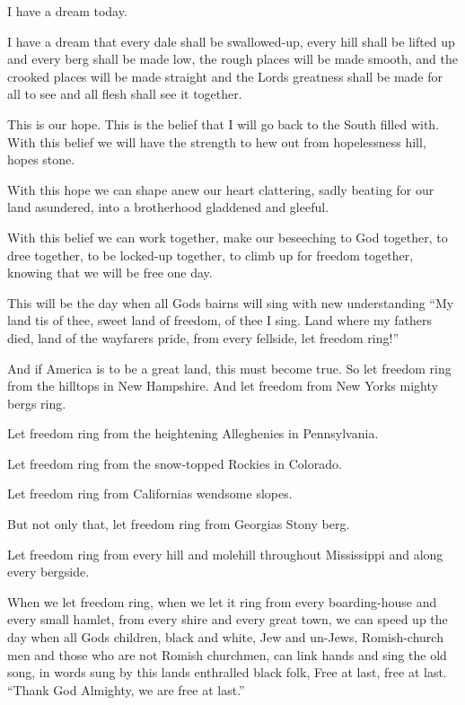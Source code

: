 I have a dream today.

I have a dream that every dale shall be swallowed-up, every hill
shall be lifted up and every berg shall be made low, the rough
places will be made smooth, and the crooked places will be made
straight and the Lord\textquotesingle{}s greatness shall be made
for all to see and all flesh shall see it together.

This is our hope. This is the belief that I will go back to the
South filled with. With this belief we will have the strength to
hew out from hopelessness\textquotesingle{} hill,
hope\textquotesingle{}s stone.

With this hope we can shape anew our heart clattering, sadly
beating for our land asundered, into a brotherhood gladdened and
gleeful.

With this belief we can work together, make our beseeching to God
together, to dree together, to be locked-up together, to climb up
for freedom together, knowing that we will be free one day.

This will be the day when all God\textquotesingle{}s bairns will
sing with new understanding ``My land \textquotesingle{}tis of
thee, sweet land of freedom, of thee I sing. Land where my fathers
died, land of the wayfarer\textquotesingle{}s pride, from every
fellside, let freedom ring!''

And if America is to be a great land, this must become true. So
let freedom ring from the hilltops in New Hampshire. And let
freedom from New York\textquotesingle{}s mighty bergs ring.

Let freedom ring from the heightening Alleghenies in Pennsylvania.

Let freedom ring from the snow-topped Rockies in Colorado.

Let freedom ring from California\textquotesingle{}s wendsome
slopes.

But not only that, let freedom ring from
Georgia\textquotesingle{}s Stony berg.

Let freedom ring from every hill and molehill throughout
Mississippi and along every bergside.

When we let freedom ring, when we let it ring from every
boarding-house and every small hamlet, from every shire and every
great town, we can speed up the day when all
God\textquotesingle{}s children, black and white, Jew and
un-Jews, Romish-church men and those who are not Romish churchmen, can link hands and sing the old song, in words sung by
this land\textquotesingle{}s enthralled black folk, Free at last,
free at last. ``Thank God Almighty, we are free at last.''
